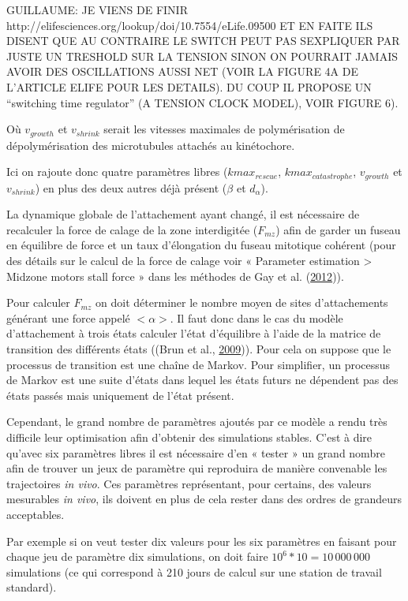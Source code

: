 \documentclass[12pt,a4paper,twoside,openright]{book}
\begin{document}
GUILLAUME: JE VIENS DE FINIR
http://elifesciences.org/lookup/doi/10.7554/eLife.09500 ET EN FAITE ILS
DISENT QUE AU CONTRAIRE LE SWITCH PEUT PAS SEXPLIQUER PAR JUSTE UN
TRESHOLD SUR LA TENSION SINON ON POURRAIT JAMAIS AVOIR DES OSCILLATIONS
AUSSI NET (VOIR LA FIGURE 4A DE L'ARTICLE ELIFE POUR LES DETAILS). DU
COUP IL PROPOSE UN ``switching time regulator'' (A TENSION CLOCK MODEL),
VOIR FIGURE 6).

Où \(v_{growth}\) et \(v_{shrink}\) serait les vitesses maximales de
polymérisation de dépolymérisation des microtubules attachés au
kinétochore.

Ici on rajoute donc quatre paramètres libres (\(kmax_{rescue}\),
\(kmax_{catastrophe}\), \(v_{growth}\) et \(v_{shrink}\)) en plus des
deux autres déjà présent (\(\beta\) et \(d_{\alpha}\)).

La dynamique globale de l'attachement ayant changé, il est nécessaire de
recalculer la force de calage de la zone interdigitée (\(F_{mz}\)) afin
de garder un fuseau en équilibre de force et un taux d'élongation du
fuseau mitotique cohérent (pour des détails sur le calcul de la force de
calage voir « Parameter estimation \textgreater{} Midzone motors stall
force » dans les méthodes de Gay et al.
(\hyperref[ref-Gay2012a]{2012})).

Pour calculer \(F_{mz}\) on doit déterminer le nombre moyen de sites
d'attachements générant une force appelé \(<\alpha>\). Il faut donc dans
le cas du modèle d'attachement à trois états calculer l'état d'équilibre
à l'aide de la matrice de transition des différents états ((Brun et al.,
\hyperref[ref-Brun2009]{2009})). Pour cela on suppose que le processus
de transition est une chaîne de Markov. Pour simplifier, un processus de
Markov est une suite d'états dans lequel les états futurs ne dépendent
pas des états passés mais uniquement de l'état présent.

Cependant, le grand nombre de paramètres ajoutés par ce modèle a rendu
très difficile leur optimisation afin d'obtenir des simulations stables.
C'est à dire qu'avec six paramètres libres il est nécessaire d'en «
tester » un grand nombre afin de trouver un jeux de paramètre qui
reproduira de manière convenable les trajectoires \emph{in vivo}. Ces
paramètres représentant, pour certains, des valeurs mesurables \emph{in
vivo}, ils doivent en plus de cela rester dans des ordres de grandeurs
acceptables.

Par exemple si on veut tester dix valeurs pour les six paramètres en
faisant pour chaque jeu de paramètre dix simulations, on doit faire
\(10^6 * 10 = 10\,000\,000\) simulations (ce qui correspond à 210 jours
de calcul sur une station de travail standard).
\end{document}
